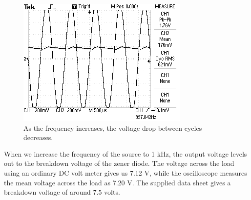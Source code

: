 \documentclass[twocolumn,english]{IEEEtran}
\begin{document}
\begin{figure}[H]
  \begin{centering}
  \begin{center}
  \includegraphics[width=\linewidth]{./DC2.png}
  \caption{As the frequency increases, the voltage drop between cycles decreases.}
  \label{fig:DC2}
  \end{center}
  \par\end{centering}
\end{figure}

When we increase the frequency of the source to 1 kHz, the output voltage levels out to the breakdown voltage of the zener diode. The voltage across the load using an ordinary DC volt meter gives us 7.12 V, while the oscilloscope measures the mean voltage across the load as 7.20 V. The supplied data sheet gives a breakdown voltage of around 7.5 volts.
\end{document}
